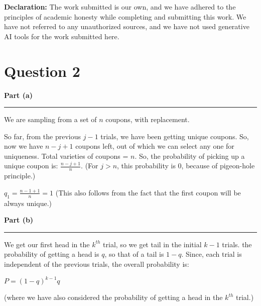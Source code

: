 \documentclass[a4paper,12pt]{article}
\title{\cooltitle{CS754 Assignment-4}}
\author{{\bf Saksham Rathi, Ekansh Ravi Shankar, Kshitij Vaidya}}
\date{}
\newenvironment{solution}[2][]{%
    \begin{mdframed}[linecolor=blue!70!black, linewidth=2pt, roundcorner=10pt, backgroundcolor=yellow!10!white, skipabove=12pt, skipbelow=12pt]%
        \textbf{\large #2}
        \par\noindent\rule{\textwidth}{0.4pt}
}{
    \end{mdframed}
}
\begin{document}
\maketitle
\textbf{Declaration:} The work submitted is our own, and
we have adhered to the principles of academic honesty while completing and submitting this work. We have not referred to any unauthorized sources, and we have not used generative AI tools for the work submitted here.

\section*{Question 2}

\begin{solution}{Part (a)}
We are sampling from a set of $n$ coupons, with replacement.

So far, from the previous $j - 1$ trials, we have been getting unique coupons. So, now we have $n - j + 1$  coupons left, out of which we can select any one for uniqueness. Total varieties of coupons = $n$. So, the probability of picking up a unique coupon is: $\frac{n-j+1}{n}$. (For $j > n$, this probability is 0, because of pigeon-hole principle.) 

$q_1 = \frac{n - 1 + 1}{n} = 1$ (This also follows from the fact that the first coupon will be always unique.)

\end{solution}


\begin{solution}{Part (b)}
  We get our first head in the $k^{th}$ trial, so we get tail in the initial $k - 1$ trials. the probability of getting a head is $q$, so that of a tail is $1-q$. Since, each trial is independent of the previous trials, the overall probability is:

  $P = (1-q)^{k-1}q$

  (where we have also considered the probability of getting a head in the $k^{th}$ trial.)
\end{solution}
\end{document}
